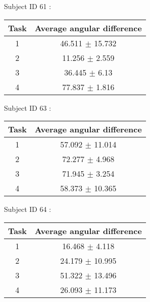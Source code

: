 \documentclass[12pt]{article}
\begin{document}
\par Subject ID  61 :
\begin{center}
\begin{tabular}{|c|c|}
\hline
 Task & Average angular difference \\ \hline
1  &  46.511 $\pm$ 15.732 \\
2  &  11.256 $\pm$ 2.559 \\
3  &  36.445 $\pm$ 6.13 \\
4  &  77.837 $\pm$ 1.816 \\
\hline
\end{tabular}
\end{center}

\par Subject ID  63 :
\begin{center}
\begin{tabular}{|c|c|}
\hline
 Task & Average angular difference \\ \hline
1  &  57.092 $\pm$ 11.014 \\
2  &  72.277 $\pm$ 4.968 \\
3  &  71.945 $\pm$ 3.254 \\
4  &  58.373 $\pm$ 10.365 \\
\hline
\end{tabular}
\end{center}

\par Subject ID  64 :
\begin{center}
\begin{tabular}{|c|c|}
\hline
 Task & Average angular difference \\ \hline
1  &  16.468 $\pm$ 4.118 \\
2  &  24.179 $\pm$ 10.995 \\
3  &  51.322 $\pm$ 13.496 \\
4  &  26.093 $\pm$ 11.173 \\
\hline
\end{tabular}
\end{center}
\end{document}
